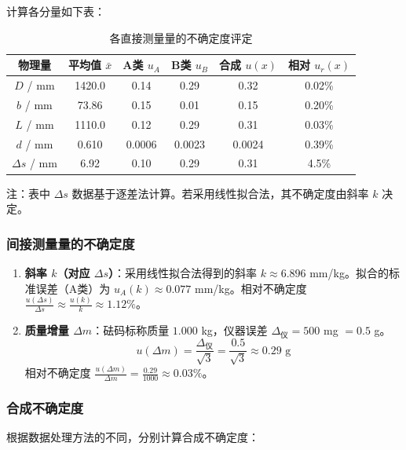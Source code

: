 \documentclass[]{../template/Report}%
\begin{document}
\begin{fullreportonly}
    计算各分量如下表：
    \begin{table}[H]
        \centering
        \caption{各直接测量量的不确定度评定}
        \small
        \begin{tabular}{cccccc}
            \toprule
            物理量             & 平均值 $\bar{x}$ & A类 $u_A$ & B类 $u_B$ & 合成 $u(x)$ & 相对 $u_r(x)$ \\
            \midrule
            $D$ / mm        & 1420.0        & 0.14     & 0.29     & 0.32      & 0.02\%      \\
            $b$ / mm        & 73.86         & 0.15     & 0.01     & 0.15      & 0.20\%      \\
            $L$ / mm        & 1110.0        & 0.12     & 0.29     & 0.31      & 0.03\%      \\
            $d$ / mm        & 0.610         & 0.0006   & 0.0023   & 0.0024    & 0.39\%      \\
            $\Delta s$ / mm & 6.92          & 0.10     & 0.29     & 0.31      & 4.5\%       \\
            \bottomrule
        \end{tabular}
    \end{table}
    注：表中 $\Delta s$ 数据基于逐差法计算。若采用线性拟合法，其不确定度由斜率 $k$ 决定。

    \subsubsection{间接测量量的不确定度}
    \begin{enumerate}
        \item \textbf{斜率 $k$（对应 $\Delta s$）}：采用线性拟合法得到的斜率 $k \approx 6.896$ mm/kg。拟合的标准误差（A类）为 $u_A(k) \approx 0.077$ mm/kg。相对不确定度 $\frac{u(\Delta s)}{\Delta s} \approx \frac{u(k)}{k} \approx 1.12\%$。
        \item \textbf{质量增量 $\Delta m$}：砝码标称质量 $1.000$ kg，仪器误差 $\Delta_{\text{仪}} = 500$ mg $= 0.5$ g。
              \[ u(\Delta m) = \frac{\Delta_{\text{仪}}}{\sqrt{3}} = \frac{0.5}{\sqrt{3}} \approx 0.29 \text{ g} \]
              相对不确定度 $\frac{u(\Delta m)}{\Delta m} = \frac{0.29}{1000} \approx 0.03\%$。
    \end{enumerate}

    \subsubsection{合成不确定度}
    根据数据处理方法的不同，分别计算合成不确定度：


\end{fullreportonly}
\end{document}
